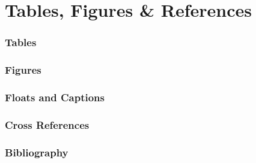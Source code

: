 \part{Tables, Figures \& References}
\section{Tables}

\section{Figures}

\section{Floats and Captions}

\section{Cross References}

\section{Bibliography}
